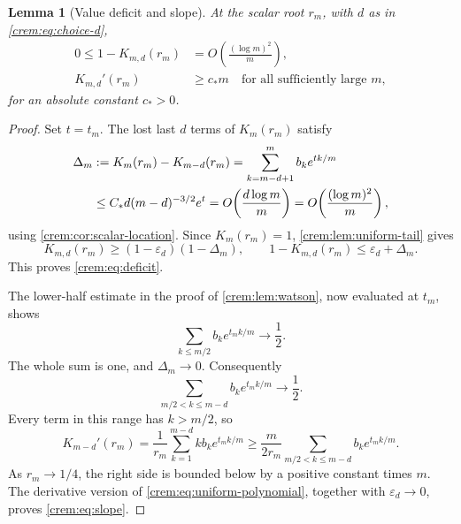 \documentclass[11pt,a4paper]{article}
\newtheorem{lemma}[lemma]{Lemma}
\theoremstyle{definition}\newaliascnt{definition}{theorem}
\theoremstyle{remark}\newaliascnt{remark}{theorem}
\newcommand{\eps}{\varepsilon}
\begin{document}
\begin{lemma}[Value deficit and slope]\label{crem:lem:deficit-slope}
At the scalar root $r_m$, with $d$ as in \eqref{crem:eq:choice-d},
\begin{align}
 0\le1-K_{m,d}(r_m)
    &=O\!\left(\frac{(\log m)^2}{m}\right),
       \label{crem:eq:deficit}\\
 K_{m,d}'(r_m)&\ge c_\ast m
       \quad\text{for all sufficiently large }m,
       \label{crem:eq:slope}
\end{align}
for an absolute constant $c_\ast>0$.
\end{lemma}
\begin{proof}
Set $t=t_m$. The lost last $d$ terms of $K_m(r_m)$ satisfy
\begin{align}
 \Delta_m&:=K_m(r_m)-K_{m-d}(r_m)
       =\sum_{k=m-d+1}^m b_ke^{tk/m}\notag\\
 &\le C_\ast d(m-d)^{-3/2}e^t
       =O\!\left(\frac{d\log m}{m}\right)
       =O\!\left(\frac{(\log m)^2}{m}\right),
 \label{crem:eq:last-d-tail}
\end{align}
using \cref{crem:cor:scalar-location}. Since $K_m(r_m)=1$,
\cref{crem:lem:uniform-tail} gives
\[
 K_{m,d}(r_m)\ge(1-\eps_d)(1-\Delta_m),
 \qquad 1-K_{m,d}(r_m)\le\eps_d+\Delta_m.
\]
This proves \eqref{crem:eq:deficit}.

The lower-half estimate in the proof of \cref{crem:lem:watson}, now
evaluated at $t_m$, shows
\[
 \sum_{k\le m/2}b_ke^{t_mk/m}\longrightarrow\frac12.
\]
The whole sum is one, and $\Delta_m\to0$. Consequently
\begin{equation}
 \sum_{m/2<k\le m-d}b_ke^{t_mk/m}\longrightarrow\frac12.
 \label{crem:eq:upper-mass}
\end{equation}
Every term in this range has $k>m/2$, so
\[
 K_{m-d}'(r_m)
 =\frac1{r_m}\sum_{k=1}^{m-d}k b_ke^{t_mk/m}
 \ge\frac{m}{2r_m}
       \sum_{m/2<k\le m-d}b_ke^{t_mk/m}.
\]
As $r_m\to1/4$, the right side is bounded below by a positive constant
times $m$. The derivative version of \eqref{crem:eq:uniform-polynomial},
together with $\eps_d\to0$, proves \eqref{crem:eq:slope}.
\end{proof}
\end{document}

